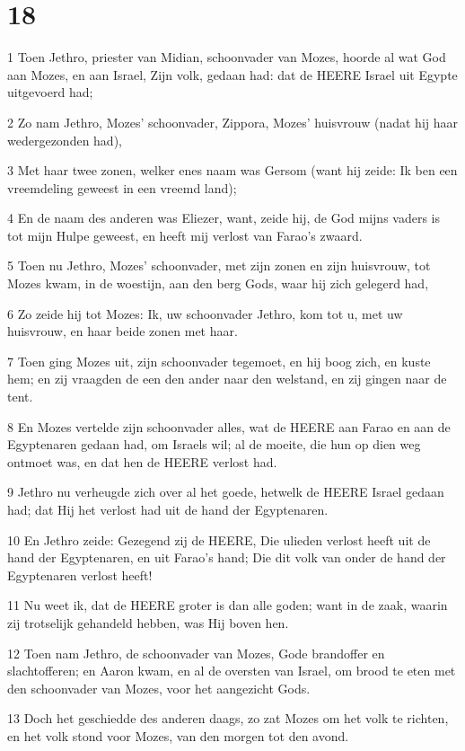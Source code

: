 \chapter{18}

\par 1 Toen Jethro, priester van Midian, schoonvader van Mozes, hoorde al wat God aan Mozes, en aan Israel, Zijn volk, gedaan had: dat de HEERE Israel uit Egypte uitgevoerd had;
\par 2 Zo nam Jethro, Mozes' schoonvader, Zippora, Mozes' huisvrouw (nadat hij haar wedergezonden had),
\par 3 Met haar twee zonen, welker enes naam was Gersom (want hij zeide: Ik ben een vreemdeling geweest in een vreemd land);
\par 4 En de naam des anderen was Eliezer, want, zeide hij, de God mijns vaders is tot mijn Hulpe geweest, en heeft mij verlost van Farao's zwaard.
\par 5 Toen nu Jethro, Mozes' schoonvader, met zijn zonen en zijn huisvrouw, tot Mozes kwam, in de woestijn, aan den berg Gods, waar hij zich gelegerd had,
\par 6 Zo zeide hij tot Mozes: Ik, uw schoonvader Jethro, kom tot u, met uw huisvrouw, en haar beide zonen met haar.
\par 7 Toen ging Mozes uit, zijn schoonvader tegemoet, en hij boog zich, en kuste hem; en zij vraagden de een den ander naar den welstand, en zij gingen naar de tent.
\par 8 En Mozes vertelde zijn schoonvader alles, wat de HEERE aan Farao en aan de Egyptenaren gedaan had, om Israels wil; al de moeite, die hun op dien weg ontmoet was, en dat hen de HEERE verlost had.
\par 9 Jethro nu verheugde zich over al het goede, hetwelk de HEERE Israel gedaan had; dat Hij het verlost had uit de hand der Egyptenaren.
\par 10 En Jethro zeide: Gezegend zij de HEERE, Die ulieden verlost heeft uit de hand der Egyptenaren, en uit Farao's hand; Die dit volk van onder de hand der Egyptenaren verlost heeft!
\par 11 Nu weet ik, dat de HEERE groter is dan alle goden; want in de zaak, waarin zij trotselijk gehandeld hebben, was Hij boven hen.
\par 12 Toen nam Jethro, de schoonvader van Mozes, Gode brandoffer en slachtofferen; en Aaron kwam, en al de oversten van Israel, om brood te eten met den schoonvader van Mozes, voor het aangezicht Gods.
\par 13 Doch het geschiedde des anderen daags, zo zat Mozes om het volk te richten, en het volk stond voor Mozes, van den morgen tot den avond.
